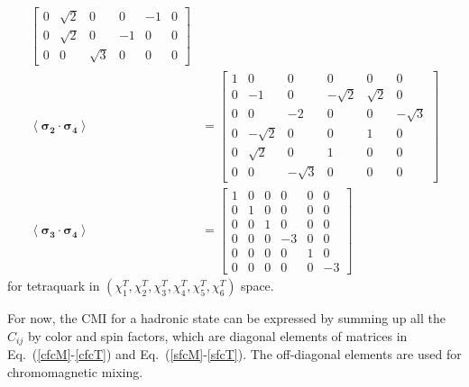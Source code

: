 \documentclass[prd,twocolumn,floatfix,nofootinbib]{revtex4}
\begin{document}
\begin{align}
\begin{bmatrix}
            0 & \sqrt{2} & 0 & 0 & -1 & 0 \\
            0 & \sqrt{2} & 0 & -1 & 0 & 0 \\
            0 & 0 & \sqrt{3} & 0 & 0 & 0
        \end{bmatrix} \\ 
        \left\langle \boldsymbol{\sigma_{2}}\cdot \boldsymbol{\sigma_{4}} \right\rangle&=
        \begin{bmatrix}
            1 & 0 & 0 & 0 & 0 & 0 \\
            0 & -1 & 0 & -\sqrt{2} & \sqrt{2} & 0 \\
            0 & 0 & -2 & 0 & 0 & -\sqrt{3} \\
            0 & -\sqrt{2} & 0 & 0 & 1 & 0 \\
            0 & \sqrt{2} & 0 & 1 & 0 & 0 \\
            0 & 0 & -\sqrt{3} & 0 & 0 & 0
        \end{bmatrix} \\ 
        \left\langle \boldsymbol{\sigma_{3}}\cdot \boldsymbol{\sigma_{4}} \right\rangle&=
        \begin{bmatrix}
            1 & 0 & 0 & 0 & 0 & 0 \\
            0 & 1 & 0 & 0 & 0 & 0 \\
            0 & 0 & 1 & 0 & 0 & 0 \\
            0 & 0 & 0 & -3 & 0 & 0 \\
            0 & 0 & 0 & 0 & 1 & 0 \\
            0 & 0 & 0 & 0 & 0 & -3
        \end{bmatrix} \label{sfcT}
    \end{align}
for tetraquark in $(\chi_{1}^{T},\chi_{2}^{T},\chi_{3}^{T},\chi_{4}^{T},\chi_{5}^{T},\chi_{6}^{T})$ space.

For now, the CMI for a hadronic state can be expressed by summing up all the $C_{ij}$ by color and spin factors, 
which are diagonal elements of matrices in Eq.~(\ref{cfcM}-\ref{cfcT}) and Eq.~(\ref{sfcM}-\ref{sfcT}).
The off-diagonal elements are used for chromomagnetic mixing.


\medskip
\end{document}
